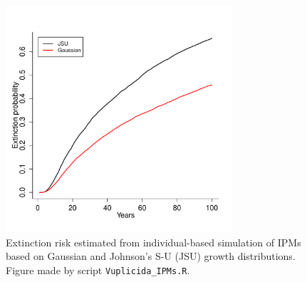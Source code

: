 \documentclass[12pt]{article}
\begin{document}
\begin{figure}[tbp]
	\centering
	\includegraphics[width=0.75\textwidth]{figures/lichen_extinction_risk}
	\caption{Extinction risk estimated from individual-based simulation of IPMs based on Gaussian and Johnson's S-U (JSU) growth distributions. Figure made by script \texttt{Vuplicida\_IPMs.R}.}
	\label{fig:lichen_extinction}
\end{figure} 
\end{document}
